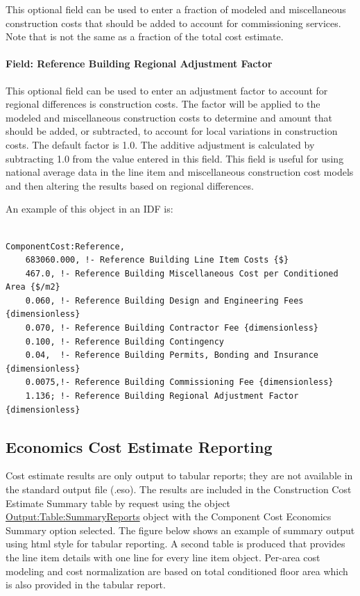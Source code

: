 This optional field can be used to enter a fraction of modeled and miscellaneous construction costs that should be added to account for commissioning services. Note that is not the same as a fraction of the total cost estimate.

\paragraph{Field: Reference Building Regional Adjustment Factor}\label{field-reference-building-regional-adjustment-factor}

This optional field can be used to enter an adjustment factor to account for regional differences is construction costs. The factor will be applied to the modeled and miscellaneous construction costs to determine and amount that should be added, or subtracted, to account for local variations in construction costs. The default factor is 1.0. The additive adjustment is calculated by subtracting 1.0 from the value entered in this field. This field is useful for using national average data in the line item and miscellaneous construction cost models and then altering the results based on regional differences.

An example of this object in an IDF is:

\begin{lstlisting}

ComponentCost:Reference,
    683060.000, !- Reference Building Line Item Costs {$}
    467.0, !- Reference Building Miscellaneous Cost per Conditioned Area {$/m2}
    0.060, !- Reference Building Design and Engineering Fees {dimensionless}
    0.070, !- Reference Building Contractor Fee {dimensionless}
    0.100, !- Reference Building Contingency
    0.04,  !- Reference Building Permits, Bonding and Insurance {dimensionless}
    0.0075,!- Reference Building Commissioning Fee {dimensionless}
    1.136; !- Reference Building Regional Adjustment Factor {dimensionless}
\end{lstlisting}

\subsection{Economics Cost Estimate Reporting}\label{economics-cost-estimate-reporting}

Cost estimate results are only output to tabular reports; they are not available in the standard output file (.eso). The results are included in the Construction Cost Estimate Summary table by request using the object \hyperref[outputtablesummaryreports]{Output:Table:SummaryReports} object with the Component Cost Economics Summary option selected. The figure below shows an example of summary output using html style for tabular reporting. A second table is produced that provides the line item details with one line for every line item object. Per-area cost modeling and cost normalization are based on total conditioned floor area which is also provided in the tabular report.

